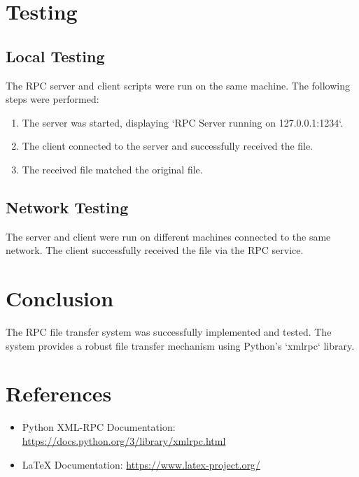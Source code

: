 \documentclass[a4paper,12pt]{article}
\begin{document}
\section*{Testing}
\subsection*{Local Testing}
The RPC server and client scripts were run on the same machine. The following steps were performed:
\begin{enumerate}
    \item The server was started, displaying `RPC Server running on 127.0.0.1:1234`.
    \item The client connected to the server and successfully received the file.
    \item The received file matched the original file.
\end{enumerate}

\subsection*{Network Testing}
The server and client were run on different machines connected to the same network. The client successfully received the file via the RPC service.

\section*{Conclusion}
The RPC file transfer system was successfully implemented and tested. The system provides a robust file transfer mechanism using Python's `xmlrpc` library.

\section*{References}
\begin{itemize}
    \item Python XML-RPC Documentation: \url{https://docs.python.org/3/library/xmlrpc.html}
    \item LaTeX Documentation: \url{https://www.latex-project.org/}
\end{itemize}
\end{document}
